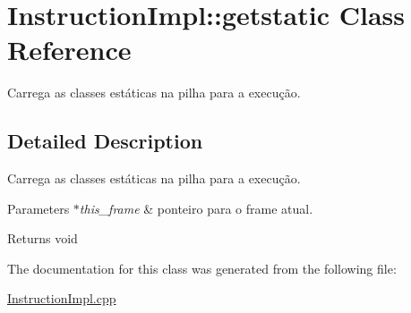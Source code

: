 \hypertarget{class_instruction_impl_1_1getstatic}{}\section{Instruction\+Impl\+:\+:getstatic Class Reference}
\label{class_instruction_impl_1_1getstatic}


Carrega as classes estáticas na pilha para a execução.  




\subsection{Detailed Description}
Carrega as classes estáticas na pilha para a execução. 


\begin{DoxyParams}{Parameters}
{\em $\ast$this\+\_\+frame} & ponteiro para o frame atual. \\
\hline
\end{DoxyParams}
\begin{DoxyReturn}{Returns}
void 
\end{DoxyReturn}


The documentation for this class was generated from the following file\+:\begin{DoxyCompactItemize}
\item 
\hyperlink{_instruction_impl_8cpp}{Instruction\+Impl.\+cpp}\end{DoxyCompactItemize}
